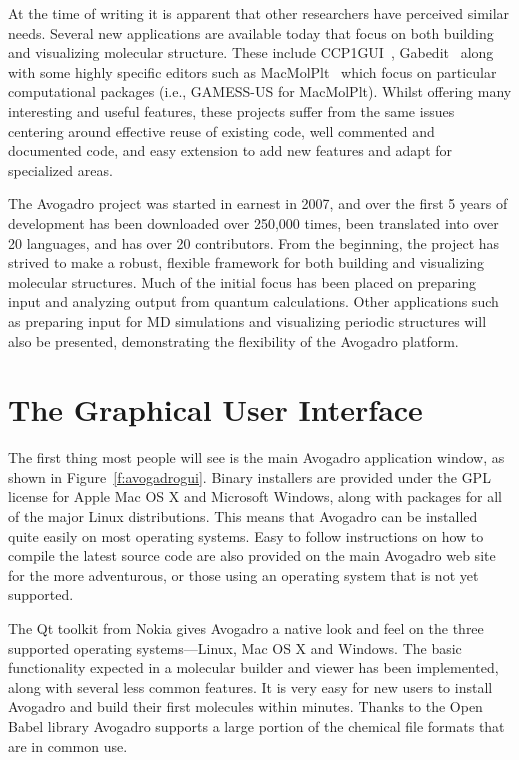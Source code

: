 \documentclass[10pt]{bmc_article}
\newenvironment{bmcformat}{\begin{raggedright}
\baselineskip20pt\sloppy\setboolean{publ}{false}}{\end{raggedright}
\baselineskip20pt\sloppy}
\begin{document}
\begin{bmcformat}
At the time of writing it is apparent that other researchers have perceived
similar needs. Several new applications are available today that focus on both
building and visualizing molecular structure. These include
CCP1GUI~\cite{CCP1GUI}, Gabedit~\cite{Gabedit} along with some highly specific
editors such as MacMolPlt~\cite{MacMolPlt} which focus on particular
computational packages (i.e., GAMESS-US for MacMolPlt). Whilst offering many
interesting and
useful features, these projects suffer from the same issues centering
around effective reuse of existing code, well commented and documented code, and
easy extension to add new features and adapt for specialized areas.

The Avogadro project was started in earnest in 2007, and over the
first 5 years of development has been downloaded over 250,000
times,\cite{Downloads} been translated into over 20
languages,\cite{Translations} and has over 20
contributors.\cite{OhlohContributors} From the beginning, the project
has strived to make a robust, flexible framework for
both building and visualizing molecular structures. Much of the initial focus
has been placed on preparing input and analyzing output from quantum
calculations. Other applications such as preparing input for MD simulations and
visualizing periodic structures will also be presented, demonstrating the
flexibility of the Avogadro platform.

\section{The Graphical User Interface}

The first thing most people will see is the main Avogadro application
window, as shown in Figure~\ref{f:avogadrogui}.
Binary installers are provided under the GPL license for Apple Mac OS X and
Microsoft Windows, along with packages for all of the major Linux distributions.
This means that Avogadro can be installed quite easily on most operating
systems. Easy to follow instructions on how to compile the latest source code
are also provided on the main Avogadro web
site\cite{CompileWindows}\cite{CompileLinux} for the more adventurous,
or those using an operating system that is not yet supported.

The Qt toolkit from Nokia gives Avogadro a native look and feel on the three
supported operating systems---Linux, Mac OS X and Windows. The basic
functionality expected in a molecular builder and viewer has been implemented,
along with several less common features. It is very easy for new users to
install Avogadro and build their
first molecules within minutes. Thanks to the Open Babel library Avogadro
supports a large portion of the chemical file formats that are in
common use.


\end{bmcformat}
\end{document}
